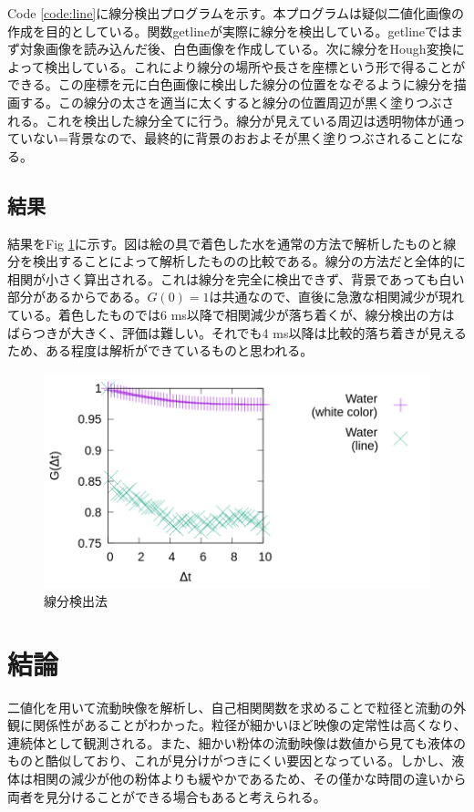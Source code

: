 \documentclass[a4j,12pt,dvipdfmx]{jsarticle}
\begin{document}
Code \ref{code:line}に線分検出プログラムを示す。本プログラムは疑似二値化画像の作成を目的としている。関数getlineが実際に線分を検出している。getlineではまず対象画像を読み込んだ後、白色画像を作成している。次に線分をHough変換によって検出している。これにより線分の場所や長さを座標という形で得ることができる。この座標を元に白色画像に検出した線分の位置をなぞるように線分を描画する。この線分の太さを適当に太くすると線分の位置周辺が黒く塗りつぶされる。これを検出した線分全てに行う。線分が見えている周辺は透明物体が通っていない=背景なので、最終的に背景のおおよそが黒く塗りつぶされることになる。

\subsection{結果}
結果をFig \ref{fig:compare}に示す。図は絵の具で着色した水を通常の方法で解析したものと線分を検出することによって解析したものの比較である。線分の方法だと全体的に相関が小さく算出される。これは線分を完全に検出できず、背景であっても白い部分があるからである。$G(0)=1$は共通なので、直後に急激な相関減少が現れている。着色したものでは6 ms以降で相関減少が落ち着くが、線分検出の方はばらつきが大きく、評価は難しい。それでも4 ms以降は比較的落ち着きが見えるため、ある程度は解析ができているものと思われる。
\begin{figure}[H]
	\includegraphics[scale=0.4]{compareline.png}
	\caption{線分検出法}
	\label{fig:compare}
\end{figure}
\section{結論}
二値化を用いて流動映像を解析し、自己相関関数を求めることで粒径と流動の外観に関係性があることがわかった。粒径が細かいほど映像の定常性は高くなり、連続体として観測される。また、細かい粉体の流動映像は数値から見ても液体のものと酷似しており、これが見分けがつきにくい要因となっている。しかし、液体は相関の減少が他の粉体よりも緩やかであるため、その僅かな時間の違いから両者を見分けることができる場合もあると考えられる。
\end{document}

